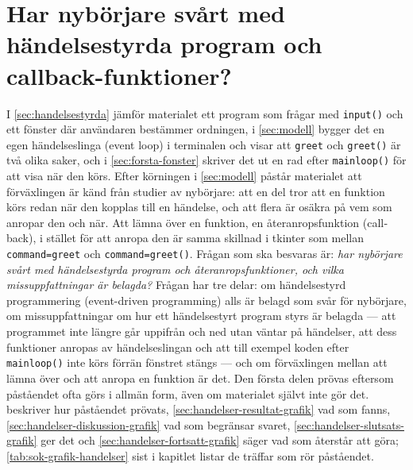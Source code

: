 \chapter[Har nybörjare svårt med händelsestyrda
    program\texorpdfstring{\newline}{} och callback-funktioner?]%
  [Har nybörjare svårt med händelsestyrda program och
    callback-funktioner?]%
  {Har nybörjare svårt med händelsestyrda program och
    callback-funktioner?}
\label{app:grafik-handelser}

I \cref{sec:handelsestyrda} jämför materialet ett program som frågar
med \texttt{input()} och ett fönster där användaren
bestämmer ordningen, i \cref{sec:modell} bygger det en egen
händelseslinga (\foreignlanguage{english}{event loop}) i terminalen och
visar att \texttt{greet} och \texttt{greet()}
är två olika saker, och i \cref{sec:forsta-fonster} skriver det ut en
rad efter \texttt{mainloop()} för att visa när den körs.
Efter körningen i \cref{sec:modell} påstår materialet att förväxlingen
är känd från studier av nybörjare: att en del tror att en funktion körs
redan när den kopplas till en händelse, och att flera är osäkra på vem
som anropar den och när\autocite{Lehtinen2021Struggle,%
Lukkarinen2021Listener}.  Att lämna över en funktion, en
återanropsfunktion (\foreignlanguage{english}{callback}), i stället för
att anropa den är samma skillnad i tkinter som mellan
\texttt{command=greet} och
\texttt{command=greet()}.  Frågan som ska besvaras är:
\emph{har nybörjare svårt med händelsestyrda program och
återanropsfunktioner, och vilka missuppfattningar är belagda?}  Frågan
har tre delar: om händelsestyrd programmering
(\foreignlanguage{english}{event-driven programming}) alls är belagd
som svår för nybörjare, om missuppfattningar om hur ett händelsestyrt
program styrs är belagda --- att programmet inte längre går uppifrån och
ned utan väntar på händelser, att dess funktioner anropas av
händelseslingan och att till exempel koden efter
\texttt{mainloop()} inte körs förrän fönstret stängs ---
och om förväxlingen mellan att lämna över och att anropa en funktion
är det.  Den första delen prövas eftersom påståendet ofta görs i
allmän form, även om materialet självt inte gör det.
 beskriver hur
påståendet prövats, \cref{sec:handelser-resultat-grafik} vad som fanns,
\cref{sec:handelser-diskussion-grafik} vad som begränsar svaret,
\cref{sec:handelser-slutsats-grafik} ger det och
\cref{sec:handelser-fortsatt-grafik} säger vad som återstår att göra;
\cref{tab:sok-grafik-handelser} sist i kapitlet listar de träffar som
rör påståendet.

